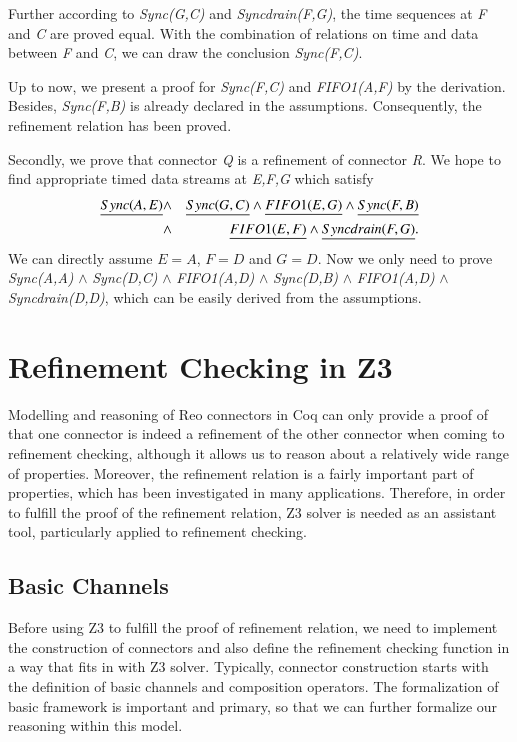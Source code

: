 \documentclass[preprint,3p]{elsarticle}
\begin{document}
Further according to \emph{Sync(G,C)} and \emph{Syncdrain(F,G)}, the time sequences at \emph{F} and \emph{C} are proved equal. With the combination of relations on time and data between \emph{F} and \emph{C}, we can draw the conclusion \emph{Sync(F,C)}.


Up to now, we present a proof for \emph{Sync(F,C)} and \emph{FIFO1(A,F)} by the derivation. Besides, \emph{Sync(F,B)} is already declared in the assumptions. Consequently, the refinement relation has been proved.

Secondly, we prove that connector \emph{Q} is a refinement of connector \emph{R}.
We hope to find appropriate timed data streams at \emph{E,F,G}  which satisfy
\begin{eqnarray*}
\emph{Sync(A,E)}&\wedge& \emph{Sync(G,C)} \wedge \emph{FIFO1(E,G)}\wedge \emph{Sync(F,B)}\\
 &\wedge& \emph{FIFO1(E,F)}\wedge \emph{Syncdrain(F,G)}.
\end{eqnarray*}
We can directly assume $E=A$, $F=D$ and $G=D$. Now we only need to prove
\emph{Sync(A,A)} $\wedge$  \emph{Sync(D,C)}  $\wedge$  \emph{FIFO1(A,D)} $\wedge$  \emph{Sync(D,B)} $\wedge$ \emph{FIFO1(A,D)} $\wedge$ \emph{Syncdrain(D,D)}, which can be easily derived from the assumptions.


\section{Refinement Checking in Z3} \label{sec:refinement}
Modelling and reasoning of Reo connectors in Coq can only provide a proof of that one connector is indeed a refinement of the other connector when coming to refinement checking, although it allows us to reason about a relatively wide range of properties. Moreover, the refinement relation is a fairly important part of properties, which has been investigated in many applications. Therefore, in order to fulfill the proof of the refinement relation, Z3 solver is needed as an assistant tool, particularly applied to refinement checking.
\subsection{Basic Channels}
Before using Z3 to fulfill the proof of refinement relation, we need to implement the construction of connectors and also define the refinement checking function in a way that fits in with Z3 solver. Typically, connector construction starts with the definition of basic channels and composition operators. The formalization of basic framework is important and primary, so that we can further formalize our reasoning within this model.
\end{document}
